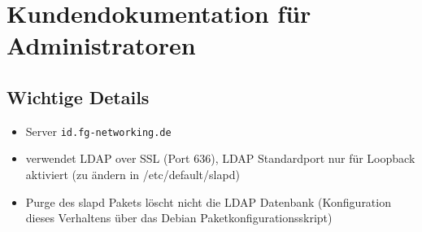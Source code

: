 %
%
%
%
%
%
%
%
%

\clearpage
\setcounter{page}{1}  %
\pagestyle{scrheadings}

\section{Kundendokumentation für Administratoren}
\subsection{Wichtige Details}
\begin{itemize}
\item Server \texttt{id.fg-networking.de}
\item verwendet LDAP over SSL (Port 636), LDAP Standardport nur für Loopback aktiviert (zu ändern in /etc/default/slapd)
\item Purge des slapd Pakets löscht nicht die LDAP Datenbank (Konfiguration dieses Verhaltens über das Debian Paketkonfigurationsskript)
\end{itemize}


